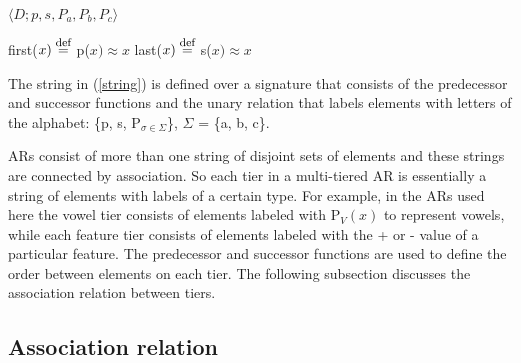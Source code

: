 \documentclass[,doc,floatsintext]{apa6}
\def\defeq{\mathrel{\buildrel \mbox{\footnotesize def} \over =}}
\theoremstyle{definition}
\theoremstyle{definition}
\theoremstyle{definition}
\theoremstyle{remark}
\begin{document}
\begin{exe}
\ex $\langle D; p, s, P_a, P_b, P_c\rangle$ \label{string}\\

\begin{xlist}
\ex first($x) \defeq$ p($x) \approx x$
\ex last($x) \defeq$ s($x) \approx x$
\end{xlist}
\end{exe}

\noindent The string in (\ref{string}) is defined over a signature that
consists of the predecessor and successor functions and the unary
relation that labels elements with letters of the alphabet: \{p, s,
P\(_{\sigma\in\Sigma}\)\}, \(\Sigma\) = \{a, b, c\}.

ARs consist of more than one string of disjoint sets of elements and
these strings are connected by association. So each tier in a
multi-tiered AR is essentially a string of elements with labels of a
certain type. For example, in the ARs used here the vowel tier consists
of elements labeled with P\(_V(x)\) to represent vowels, while each
feature tier consists of elements labeled with the + or - value of a
particular feature. The predecessor and successor functions are used to
define the order between elements on each tier. The following subsection
discusses the association relation between tiers.

\subsection{Association relation}\label{association-relation}
\end{document}
